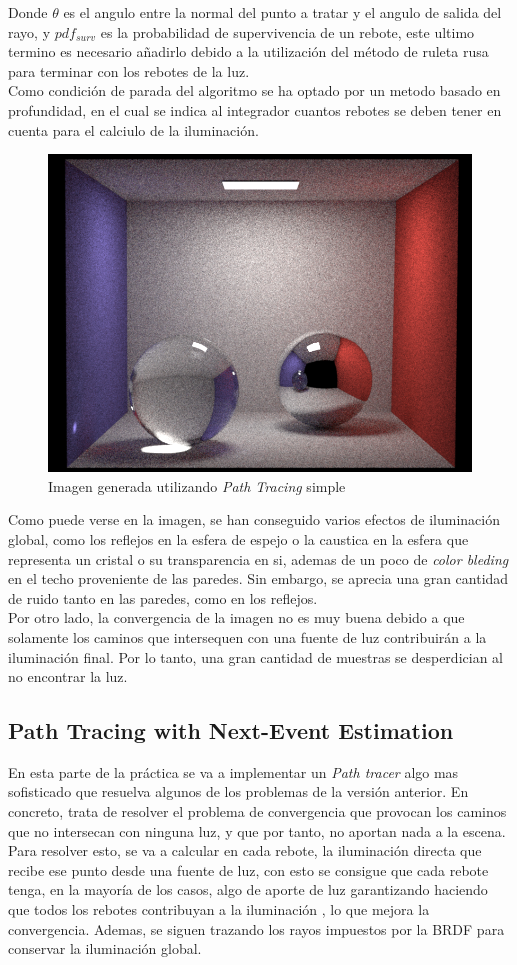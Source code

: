 \documentclass[10pt,oneside,a4paper]{article}
\begin{document}
Donde $\theta$ es el angulo entre la normal del punto a tratar y el angulo de salida del rayo, y $pdf_{surv}$ es la probabilidad de supervivencia de un rebote, este ultimo termino es necesario añadirlo debido a la utilización del método de ruleta rusa para terminar con los rebotes de la luz.\\

Como condición de parada del algoritmo se ha optado por un metodo basado en profundidad, en el cual se indica al integrador cuantos rebotes se deben tener en cuenta para el calciulo de la iluminación.\\

\begin{figure}[h]
\centering
\includegraphics[width=.6\linewidth]{images/cbox_path_512.png}
\caption{Imagen generada utilizando \textit{Path Tracing} simple}
\label{fig:disp}
\end{figure}

Como puede verse en la imagen, se han conseguido varios efectos de iluminación global, como los reflejos en la esfera de espejo o la caustica en la esfera que representa un cristal o su transparencia en si, ademas de un poco de \textit{ color bleding} en el techo proveniente de las paredes. Sin embargo, se aprecia una gran cantidad de ruido tanto en las paredes, como en los reflejos.\\

Por otro lado, la convergencia de la imagen no es muy buena debido a que solamente los caminos que intersequen con una fuente de luz contribuirán a la iluminación final. Por lo tanto, una gran cantidad de muestras se desperdician al no encontrar la luz.

\subsection{Path Tracing with Next-Event Estimation}
En esta parte de la práctica se va a implementar un \textit{Path tracer} algo mas sofisticado que resuelva algunos de los problemas de la versión anterior. En concreto, trata de resolver el problema de convergencia que provocan los caminos que no intersecan con ninguna luz, y que por tanto, no aportan nada a la escena. Para resolver esto, se va a calcular en cada rebote, la iluminación directa que recibe ese punto desde una fuente de luz, con esto se consigue que cada rebote tenga, en la mayoría de los casos, algo de aporte de luz garantizando haciendo que todos los rebotes contribuyan a la iluminación , lo que mejora la convergencia. Ademas, se siguen trazando los rayos impuestos por la BRDF para conservar la iluminación global.\\
\end{document}
